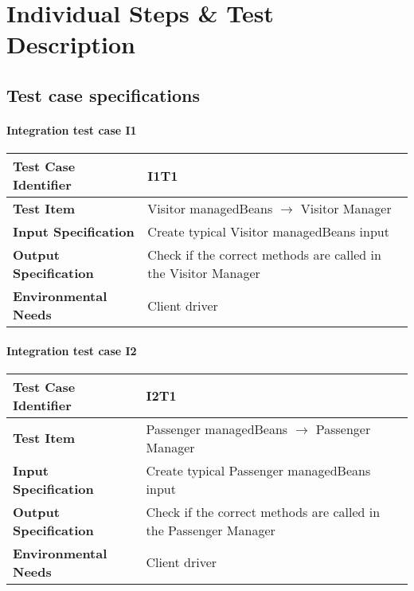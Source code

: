 \chapter{Individual Steps \& Test Description} \label{chap3}

\section{Test case specifications}


\subsubsection{Integration test case I1}

\begin{table}[!htbp]
\begin{center}
\begin{tabular}[t]{p{}p{}}

\hline
\textbf{Test Case Identifier} & I1T1 \\
\hline
\textbf{Test Item} & Visitor managedBeans $\rightarrow$ Visitor Manager \\
\hline
\textbf{Input Specification} & Create typical Visitor managedBeans input  \\
\hline
\textbf{Output Specification} & Check if the correct methods are called in the Visitor Manager \\
\hline
\textbf{Environmental Needs} & Client driver \\
\hline

\end{tabular}
\end{center}
\end{table}
\clearpage

\subsubsection{Integration test case I2}

\begin{table}[!htbp]
\begin{center}
\begin{tabular}[t]{p{}p{}}

\hline
\textbf{Test Case Identifier} & I2T1 \\
\hline
\textbf{Test Item} & Passenger managedBeans $\rightarrow$ Passenger Manager \\
\hline
\textbf{Input Specification} & Create typical Passenger managedBeans input  \\
\hline
\textbf{Output Specification} & Check if the correct methods are called in the Passenger Manager \\
\hline
\textbf{Environmental Needs} & Client driver \\
\hline

\end{tabular}
\end{center}
\end{table}

